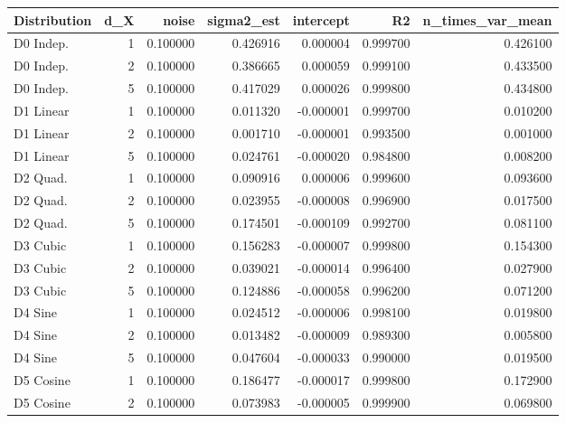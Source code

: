 
\begin{tabular}{lrrrrrr}
\toprule
Distribution &  d\_X &    noise &  sigma2\_est &  intercept &       R2 &  n\_times\_var\_mean \\
\midrule
   D0 Indep. &    1 & 0.100000 &    0.426916 &   0.000004 & 0.999700 &          0.426100 \\
   D0 Indep. &    2 & 0.100000 &    0.386665 &   0.000059 & 0.999100 &          0.433500 \\
   D0 Indep. &    5 & 0.100000 &    0.417029 &   0.000026 & 0.999800 &          0.434800 \\
   D1 Linear &    1 & 0.100000 &    0.011320 &  -0.000001 & 0.999700 &          0.010200 \\
   D1 Linear &    2 & 0.100000 &    0.001710 &  -0.000001 & 0.993500 &          0.001000 \\
   D1 Linear &    5 & 0.100000 &    0.024761 &  -0.000020 & 0.984800 &          0.008200 \\
    D2 Quad. &    1 & 0.100000 &    0.090916 &   0.000006 & 0.999600 &          0.093600 \\
    D2 Quad. &    2 & 0.100000 &    0.023955 &  -0.000008 & 0.996900 &          0.017500 \\
    D2 Quad. &    5 & 0.100000 &    0.174501 &  -0.000109 & 0.992700 &          0.081100 \\
    D3 Cubic &    1 & 0.100000 &    0.156283 &  -0.000007 & 0.999800 &          0.154300 \\
    D3 Cubic &    2 & 0.100000 &    0.039021 &  -0.000014 & 0.996400 &          0.027900 \\
    D3 Cubic &    5 & 0.100000 &    0.124886 &  -0.000058 & 0.996200 &          0.071200 \\
     D4 Sine &    1 & 0.100000 &    0.024512 &  -0.000006 & 0.998100 &          0.019800 \\
     D4 Sine &    2 & 0.100000 &    0.013482 &  -0.000009 & 0.989300 &          0.005800 \\
     D4 Sine &    5 & 0.100000 &    0.047604 &  -0.000033 & 0.990000 &          0.019500 \\
   D5 Cosine &    1 & 0.100000 &    0.186477 &  -0.000017 & 0.999800 &          0.172900 \\
   D5 Cosine &    2 & 0.100000 &    0.073983 &  -0.000005 & 0.999900 &          0.069800 \\

\end{tabular}
